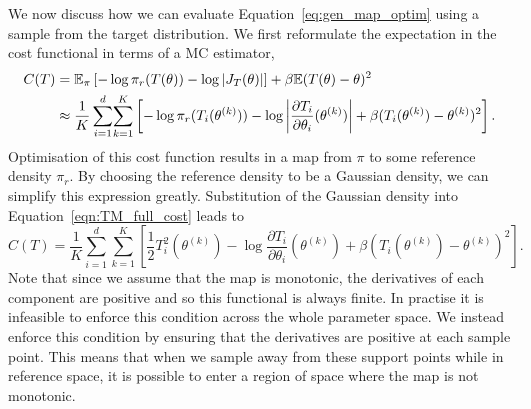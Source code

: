 \documentclass[final]{siamltex}
\begin{document}
We now discuss how we can evaluate Equation~\eqref{eq:gen_map_optim} using a sample from the target distribution. We first reformulate the expectation in the cost functional in terms of a MC estimator,
\begin{align}
	C(T) &= \mathbb{E}_\pi\left[ -\log\pi_r(T(\theta)) - \log|J_T(\theta)|\right] +
			\beta\mathbb{E}(T(\theta)-\theta)^2 \notag \\
		&\approx \frac{1}{K}\sum\limits_{i=1}^d \! \sum\limits_{k=1}^K \left[-\log\pi_r(T_i(\theta^{(k)})) -
			\log\left|\frac{\partial T_i}{\partial \theta_i}(\theta^{(k)})\right| + \beta(T_i(\theta^{(k)})-\theta^{(k)})^2\right]. \label{eqn:TM_full_cost}
\end{align}
Optimisation of this cost function results in a map from $\pi$ to some reference density $\pi_r$. By choosing the reference density to be a Gaussian density, we can simplify this expression greatly. Substitution of the Gaussian density into Equation~\eqref{eqn:TM_full_cost} leads to
\begin{equation}\label{eq:gauss_map_optim}
	C(T) = \frac{1}{K}\sum\limits_{i=1}^d \! \sum\limits_{k=1}^K \left[\frac{1}{2}
		T_i^2(\theta^{(k)}) - \log\frac{\partial T_i}{\partial \theta_i}(\theta^{(k)}) +
		\beta(T_i(\theta^{(k)})-\theta^{(k)})^2\right].
\end{equation}
Note that since we assume that the map is monotonic, the derivatives of each component are
positive and so this functional is always finite. In practise it is infeasible to enforce this condition across the whole parameter space. We instead enforce this condition by ensuring that the derivatives are positive at each sample point. This means that when we sample away from these support points while in reference space, it is possible to enter a region of space where the map is not monotonic.
\end{document}
